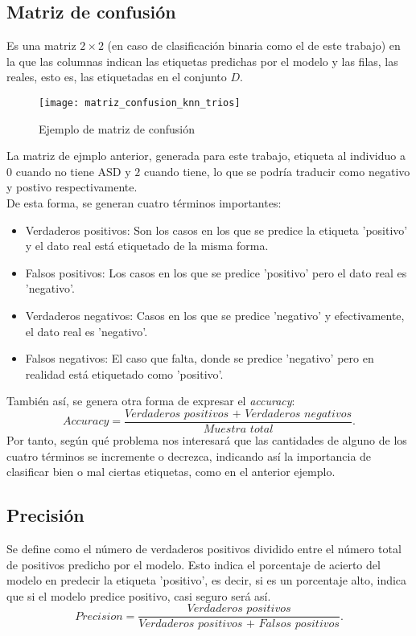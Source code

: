 \subsection{Matriz de confusión}\label{Confusion}
Es una matriz $2 \times 2$ (en caso de clasificación binaria como el de este trabajo) en la que las columnas indican las etiquetas predichas por el modelo y las filas, las reales, esto es, las etiquetadas en el conjunto $D$.
\begin{figure}[H]
  \centering
  \texttt{[image: matriz\_confusion\_knn\_trios]}
  \caption{Ejemplo de matriz de confusión}
  \label{fig:svm1}
\end{figure}
\begin{center}
\end{center}
La matriz de ejmplo anterior, generada para este trabajo, etiqueta al individuo a $0$ cuando no tiene ASD y $2$ cuando tiene, lo que se podría traducir como negativo y postivo respectivamente.\\
De esta forma, se generan cuatro términos importantes:
\begin{itemize}
  \item Verdaderos positivos: Son los casos en los que se predice la etiqueta 'positivo' y el dato real está etiquetado de la misma forma.
  \item Falsos positivos: Los casos en los que se predice 'positivo' pero el dato real es 'negativo'.
  \item Verdaderos negativos: Casos en los que se predice 'negativo' y efectivamente, el dato real es 'negativo'.
  \item Falsos negativos: El caso que falta, donde se predice 'negativo' pero en realidad está etiquetado como 'positivo'.
\end{itemize}
También así, se genera otra forma de expresar el \textit{accuracy}:
\[ Accuracy=\frac{\textit{Verdaderos positivos + Verdaderos negativos}}{\textit{Muestra total}}. \]
Por tanto, según qué problema nos interesará que las cantidades de alguno de los cuatro términos se incremente o decrezca, indicando así la importancia de clasificar bien o mal ciertas etiquetas, como en el anterior ejemplo.
\subsection{Precisión}
Se define como el número de verdaderos positivos dividido entre el número total de positivos predicho por el modelo. Esto indica el porcentaje de acierto del modelo en predecir la etiqueta 'positivo', es decir, si es un porcentaje alto, indica que si el modelo predice positivo, casi seguro será así.
\[ Precision=\frac{\textit{Verdaderos positivos}}{\textit{Verdaderos positivos + Falsos positivos}}. \]
